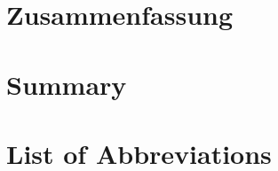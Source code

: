 \documentclass[11pt,singlespacinge,twoside]{reedthesis} %
\begin{document}
\hypertarget{zusammenfassung}{%
\chapter*{Zusammenfassung}\label{zusammenfassung}}

\hypertarget{summary}{%
\chapter*{Summary}\label{summary}}

\hypertarget{list-of-abbreviations}{%
\chapter*{List of Abbreviations}\label{list-of-abbreviations}}
\end{document}
